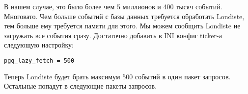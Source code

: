 В нашем случае, это было более чем 5 миллионов и 400 тысяч событий. Многовато. Чем больше событий 
с базы данных требуется обработать Londiste, тем больше ему требуется памяти для этого. Мы можем сообщить 
Londiste не загружать все события сразу. Достаточно добавить в INI конфиг ticker-а следующую настройку:
\begin{verbatim}
pgq_lazy_fetch = 500
\end{verbatim}
 
Теперь Londiste будет брать максимум 500 событий в один пакет запросов. Остальные попадут в следующие пакеты запросов.